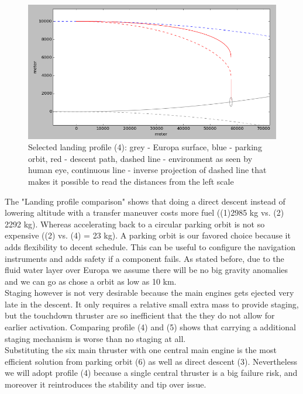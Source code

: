 \begin{figure}[htb]
	\centering
	\includegraphics[width=\textwidth]{figures/Lander/aaronlandingprofile}
	\caption{Selected landing profile (4): grey - Europa surface, blue - parking orbit, red - descent path, dashed line - environment as seen by human eye, continuous line - inverse projection of dashed line that makes it possible to read the distances from the left scale\label{fig:alandingprofile}}
\end{figure}


The "Landing profile comparison" shows that doing a direct descent instead of lowering altitude with a transfer maneuver costs more fuel ((1)2985 kg vs. (2) 2292 kg). Whereas accelerating back to a circular parking orbit is not so expensive ((2) vs. (4) = 23 kg). A parking orbit is our favored choice because it adds flexibility to decent schedule. This can be useful to configure the navigation instruments and adds safety if a component fails. As stated before, due to the fluid water layer over Europa we assume there will be no big gravity anomalies and we can go as chose a orbit as low as 10 km.\\ 
Staging however is not very desirable because the main engines gets ejected very late in the descent. It only requires a relative small extra mass to provide staging, but the touchdown thruster are so inefficient that the they do not allow for earlier activation. Comparing profile (4) and (5) shows that carrying a additional staging mechanism is worse than no staging at all.\\
Substituting the six main thruster with one central main engine is the most efficient solution from parking orbit (6) as well as direct descent (3). Nevertheless we will adopt profile (4) because a single central thruster is a big failure risk, and moreover it reintroduces the stability and tip over issue.


